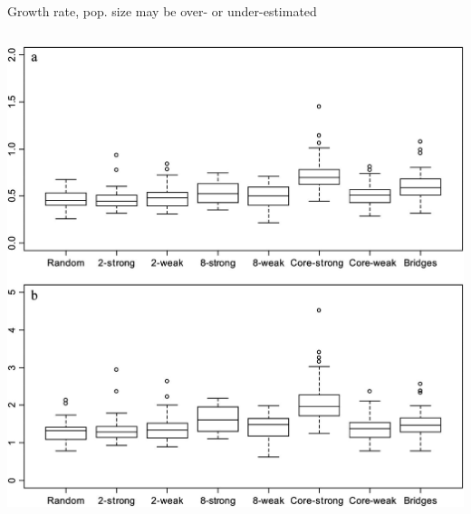 \documentclass{beamer}
\begin{document}
\begin{frame}{Growth rate, pop. size may be over- or under-estimated}
\begin{columns}
    \begin{column}{0.7\textwidth}
      \vspace{0.5cm}
      \includegraphics[height=0.8\textheight]{F7}
    \end{column}
  \end{columns}
\end{frame}
\end{document}
